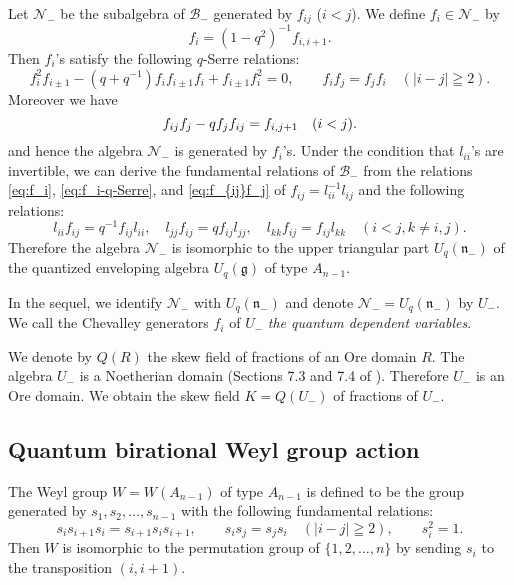 \documentclass[12pt,twoside]{article}
\newcommand\B{{\mathcal B}}
\newcommand\N{{\mathcal N}}
\newcommand\g{{\mathfrak g}}
\newcommand\n{{\mathfrak n}}
\theoremstyle{plain} %
\theoremstyle{definition} %
\theoremstyle{definition} %
\numberwithin{theorem}{section}
\numberwithin{equation}{section}
\numberwithin{figure}{section}
\numberwithin{table}{section}
\begin{document}
Let $\N_-$ be the subalgebra of $\B_-$ generated by $f_{ij}$ ($i<j$).
We define $f_i\in\N_-$ by
\begin{equation}
 f_i = (1-q^2)^{-1} f_{i,i+1}.
 \label{eq:f_i}
\end{equation}
Then $f_i$'s satisfy the following $q$-Serre relations:
\begin{equation}
 f_i^2 f_{i\pm1} - (q+q^{-1}) f_if_{i\pm1}f_i + f_{i\pm1}f_i^2=0, \qquad
 f_if_j=f_jf_i \quad (|i-j|\geqq 2).
 \label{eq:f_i-q-Serre}
\end{equation}
Moreover we have
\begin{equation}
 f_{ij}f_j - q f_j f_{ij} = f_{i,j+1} \quad (i<j).
 \label{eq:f_{ij}f_j}
\end{equation}
and hence the algebra $\N_-$ is generated by $f_i$'s.
Under the condition that $l_{ii}$'s are invertible, 
we can derive the fundamental relations of $\B_-$ from
the relations \eqref{eq:f_i}, \eqref{eq:f_i-q-Serre}, 
and \eqref{eq:f_{ij}f_j} of $f_{ij}=l_{ii}^{-1}l_{ij}$ 
and the following relations:
\begin{equation*}
 l_{ii}f_{ij}=q^{-1}f_{ij}l_{ii}, \quad
 l_{jj}f_{ij}=q     f_{ij}l_{jj}, \quad
 l_{kk}f_{ij}=f_{ij}l_{kk} \quad
 (i<j, k\ne i,j).
\end{equation*}
Therefore the algebra $\N_-$ is isomorphic to  
the upper triangular part $U_q(\n_-)$ 
of the quantized enveloping algebra $U_q(\g)$ of type $A_{n-1}$.

In the sequel, we identify $\N_-$ with $U_q(\n_-)$
and denote $\N_-=U_q(\n_-)$ by $U_-$. 
We call the Chevalley generators $f_i$ of $U_-$ 
{\em the quantum dependent variables}.

We denote by $Q(R)$ the skew field of fractions of an Ore domain $R$.
The algebra $U_-$ is a Noetherian domain 
(Sections 7.3 and 7.4 of \cite{Jos-1995}).
Therefore $U_-$ is an Ore domain.
We obtain the skew field $K=Q(U_-)$ of fractions of $U_-$. 


\subsection{Quantum birational Weyl group action}
\label{sec:Weyl-A_{n-1}}

The Weyl group $W=W(A_{n-1})$ of type $A_{n-1}$ is defined to be the group
generated by $s_1,s_2,\ldots,s_{n-1}$ with the following fundamental relations:
\begin{equation}
 s_i s_{i+1}s_i = s_{i+1}s_i s_{i+1}, \qquad
 s_i s_j = s_j s_i \quad (|i-j|\geqq 2), \qquad
 s_i^2 = 1.
 \label{eq:Weyl}
\end{equation}
Then $W$ is isomorphic to the permutation group of $\{1,2,\ldots,n\}$ 
by sending $s_i$ to the transposition $(i,i+1)$.
\end{document}
